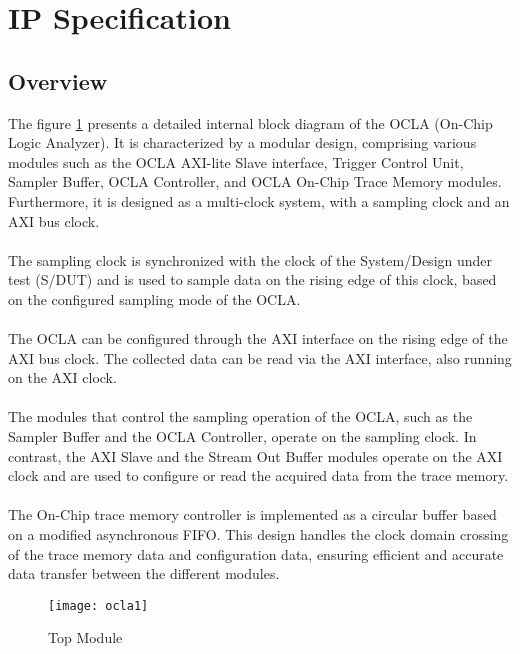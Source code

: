 \newpage
{}
\section*{\hfill IP Specification}

\subsection*{\fontsize{14}{16}\selectfont Overview}
The figure \ref{fig:ocla1} presents a detailed internal block diagram of the OCLA (On-Chip Logic Analyzer). It is characterized by a modular design, comprising various modules such as the OCLA AXI-lite Slave interface, Trigger Control Unit, Sampler Buffer, OCLA Controller, and OCLA On-Chip Trace Memory modules. Furthermore, it is designed as a multi-clock system, with a sampling clock and an AXI bus clock.
\\ \\The sampling clock is synchronized with the clock of the System/Design under test (S/DUT) and is used to sample data on the rising edge of this clock, based on the configured sampling mode of the OCLA. 
\\ \\The OCLA can be configured through the AXI interface on the rising edge of the AXI bus clock. The collected data can be read via the AXI interface, also running on the AXI clock.
\\ \\The modules that control the sampling operation of the OCLA, such as the Sampler Buffer and the OCLA Controller, operate on the sampling clock. In contrast, the AXI Slave and the Stream Out Buffer modules operate on the AXI clock and are used to configure or read the acquired data from the trace memory.
\\ \\The On-Chip trace memory controller is implemented as a circular buffer based on a modified asynchronous FIFO. This design handles the clock domain crossing of the trace memory data and configuration data, ensuring efficient and accurate data transfer between the different modules.

\begin{figure}[h]\centering %
	\texttt{[image: ocla1]}
	\caption{Top Module}
	\label{fig:ocla1}
\end{figure}


